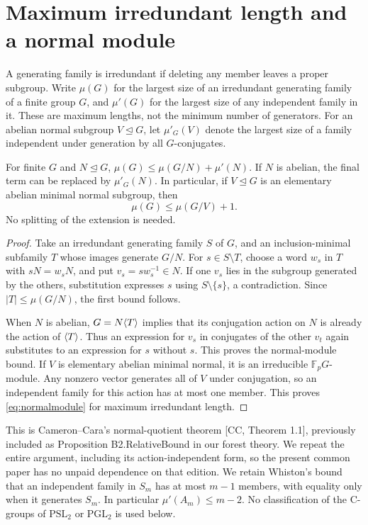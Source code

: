 \section{Maximum irredundant length and a normal module}
A generating family is irredundant if deleting any member leaves a
proper subgroup. Write $\mu(G)$ for the largest size of an irredundant
generating family of a finite group $G$, and $\mu'(G)$ for the largest
size of any independent family in it. These are maximum lengths,
not the minimum number of generators. For an abelian normal subgroup
$V\unlhd G$, let $\mu'_G(V)$ denote the largest size of a family
independent under generation by all $G$-conjugates.

\begin{lemma}\label{lem:quotient}
For finite $G$ and $N\unlhd G$,
$\mu(G)\leq\mu(G/N)+\mu'(N)$. If $N$ is abelian, the final term
can be replaced by $\mu'_G(N)$. In particular, if $V\unlhd G$ is
an elementary abelian minimal normal subgroup, then
\begin{equation}\label{eq:normalmodule}
 \mu(G)\leq\mu(G/V)+1.                                      \end{equation}
No splitting of the extension is needed.
\end{lemma}
\begin{proof}
Take an irredundant generating family $S$ of $G$, and an inclusion-minimal
subfamily $T$ whose images generate $G/N$. For $s\in S\setminus T$,
choose a word $w_s$ in $T$ with $sN=w_sN$, and put
$v_s=sw_s^{-1}\in N$. If one $v_s$ lies in the subgroup generated by
the others, substitution expresses $s$ using $S\setminus\{s\}$,
a contradiction. Since $|T|\leq\mu(G/N)$, the first bound follows.

When $N$ is abelian, $G=N\langle T\rangle$ implies that its conjugation action
on $N$ is already the action of $\langle T\rangle$. Thus an expression for
$v_s$ in conjugates of the other $v_t$ again substitutes to an
expression for $s$ without $s$. This proves the normal-module bound.
If $V$ is elementary abelian minimal normal, it is an irreducible
$\mathbb F_pG$-module. Any nonzero vector generates all of $V$ under
conjugation, so an independent family for this action has at most one
member. This proves \eqref{eq:normalmodule} for maximum irredundant length.
\end{proof}

This is Cameron--Cara's normal-quotient theorem [CC, Theorem 1.1],
previously included as Proposition B2.RelativeBound in our forest theory.
We repeat the entire argument, including its action-independent form,
so the present common paper has no unpaid dependence on that edition. We retain Whiston's bound that an independent family in $S_m$
has at most $m-1$ members, with equality only when it generates $S_m$.
In particular $\mu'(A_m)\leq m-2$. No classification of the C-groups
of $\mathrm{PSL}_2$ or $\mathrm{PGL}_2$ is used below.

